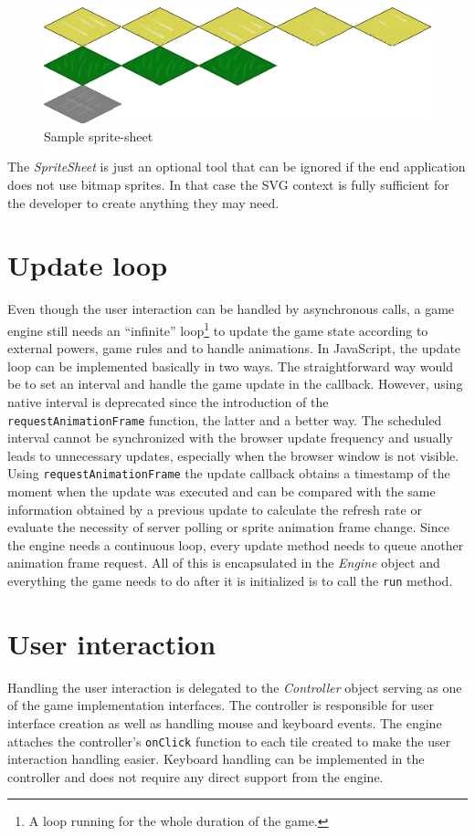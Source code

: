 \documentclass[11pt,oneside, final]{fithesis2}
\begin{document}
\begin{figure}[h]
	\centering
	\includegraphics[width=\textwidth]{thesis-spritesheet}
	\caption{Sample sprite-sheet}
	\label{spritesheet}
\end{figure}

The \emph{SpriteSheet} is just an optional tool that can be ignored if the end application does not use bitmap sprites. In that case the SVG context is fully sufficient for the developer to create anything they may need.

\section{Update loop}
Even though the user interaction can be handled by asynchronous calls, a game engine still needs an ``infinite'' loop\footnote{A loop running for the whole duration of the game.} to update the game state according to external powers, game rules and to handle animations. In JavaScript, the update loop can be implemented basically in two ways. The straightforward way would be to set an interval and handle the game update in the callback. However, using native interval is deprecated since the introduction of the \texttt{requestAnimationFrame} function\cite{raf}, the latter and a better way. The scheduled interval cannot be synchronized with the browser update frequency and usually leads to unnecessary updates, especially when the browser window is not visible\cite{animationtiming}. Using \texttt{requestAnimationFrame} the update callback obtains a timestamp of the moment when the update was executed and can be compared with the same information obtained by a previous update to calculate the refresh rate or evaluate the necessity of server polling or sprite animation frame change. Since the engine needs a continuous loop, every update method needs to queue another animation frame request\cite{raf}. All of this is encapsulated in the \emph{Engine} object and everything the game needs to do after it is initialized is to call the \texttt{run} method.

\section{User interaction}
Handling the user interaction is delegated to the \emph{Controller} object serving as one of the game implementation interfaces. The controller is responsible for user interface creation as well as handling mouse and keyboard events. The engine attaches the controller's \texttt{onClick} function to each tile created to make the user interaction handling easier. Keyboard handling can be implemented in the controller and does not require any direct support from the engine.
\end{document}
